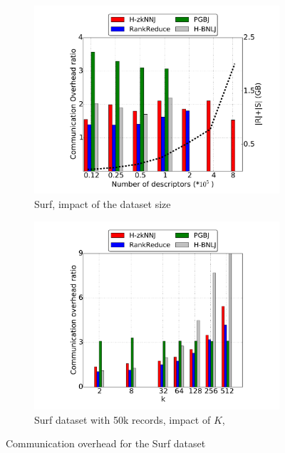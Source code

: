 \documentclass[10pt,journal,compsoc]{IEEEtran}
\begin{document}
\begin{figure}[htp]
	\centering
	\begin{subfigure}[b]{0.48\textwidth}
		\includegraphics[width=\textwidth]{shuffle_surf.pdf}
		\caption{Surf, impact of the dataset size\label{fig:surf_data_shuffle}}        
	\end{subfigure}%
	\begin{subfigure}[b]{0.48\textwidth}
		\includegraphics[width=\textwidth]{shuffle_k.pdf} 
		\caption{Surf dataset with 50k records, impact of $K$,\label{fig:surf_k_shuffle}}
	\end{subfigure}%
	\caption{Communication overhead for the Surf dataset}      
\end{figure}
\end{document}
